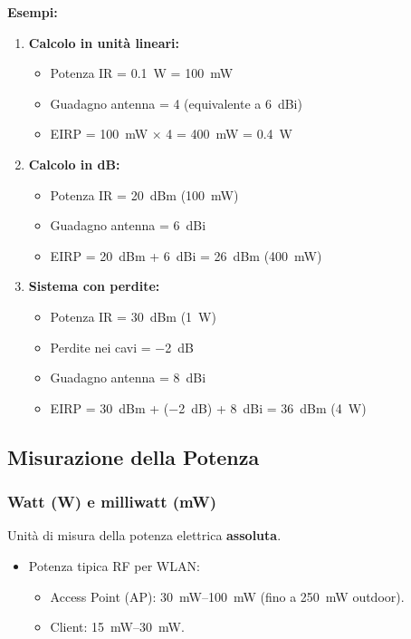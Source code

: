 \textbf{Esempi:}
\begin{enumerate}
    \item \textbf{Calcolo in unità lineari:}
    \begin{itemize}
        \item Potenza IR = \SI{0.1}{\watt} = \SI{100}{\milli\watt}
        \item Guadagno antenna = 4 (equivalente a \SI{6}{dBi})
        \item EIRP = \SI{100}{\milli\watt} × 4 = \SI{400}{\milli\watt} = \SI{0.4}{\watt}
    \end{itemize}

    \item \textbf{Calcolo in dB:}
    \begin{itemize}
        \item Potenza IR = \SI{20}{dBm} (\SI{100}{\milli\watt})
        \item Guadagno antenna = \SI{6}{dBi}
        \item EIRP = \SI{20}{dBm} + \SI{6}{dBi} = \SI{26}{dBm} (\SI{400}{\milli\watt})
    \end{itemize}

    \item \textbf{Sistema con perdite:}
    \begin{itemize}
        \item Potenza IR = \SI{30}{dBm} (\SI{1}{\watt})
        \item Perdite nei cavi = \SI{-2}{dB}
        \item Guadagno antenna = \SI{8}{dBi}
        \item EIRP = \SI{30}{dBm} + (\SI{-2}{dB}) + \SI{8}{dBi} = \SI{36}{dBm} (\SI{4}{\watt})
    \end{itemize}
\end{enumerate}

\subsection{Misurazione della Potenza}
\subsubsection{Watt (W) e milliwatt (mW)}
Unità di misura della potenza elettrica \textbf{assoluta}.
\begin{itemize}
    \item Potenza tipica RF per WLAN:
    \begin{itemize}
        \item Access Point (AP): \SIrange{30}{100}{\milli\watt} (fino a \SI{250}{\milli\watt} outdoor).
        \item Client: \SIrange{15}{30}{\milli\watt}.
    \end{itemize}
\end{itemize}


